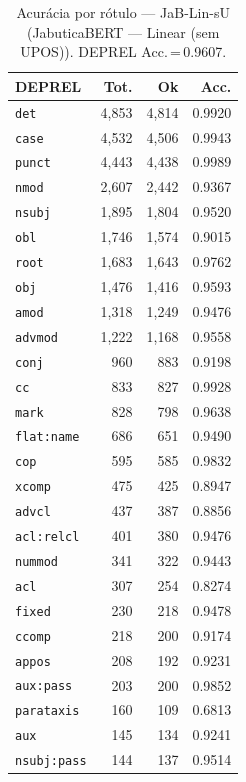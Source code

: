 \begin{table}[ht]
\centering
\caption{Acurácia por rótulo --- JaB-Lin-sU (JabuticaBERT — Linear (sem UPOS)). DEPREL Acc.\,=\,0.9607.}
\label{tab:acc-predict-test-ablacao-linear-amadeusai-modernJabuticaBERT-Base-1k}
\scriptsize
\begin{tabular}{lrrr}
\toprule
\textbf{DEPREL} & \textbf{Tot.} & \textbf{Ok} & \textbf{Acc.} \\
\midrule
\texttt{det} & 4,853 & 4,814 & 0.9920 \\
\texttt{case} & 4,532 & 4,506 & 0.9943 \\
\texttt{punct} & 4,443 & 4,438 & 0.9989 \\
\texttt{nmod} & 2,607 & 2,442 & 0.9367 \\
\texttt{nsubj} & 1,895 & 1,804 & 0.9520 \\
\texttt{obl} & 1,746 & 1,574 & 0.9015 \\
\texttt{root} & 1,683 & 1,643 & 0.9762 \\
\texttt{obj} & 1,476 & 1,416 & 0.9593 \\
\texttt{amod} & 1,318 & 1,249 & 0.9476 \\
\texttt{advmod} & 1,222 & 1,168 & 0.9558 \\
\texttt{conj} & 960 & 883 & 0.9198 \\
\texttt{cc} & 833 & 827 & 0.9928 \\
\texttt{mark} & 828 & 798 & 0.9638 \\
\texttt{flat\!:\!name} & 686 & 651 & 0.9490 \\
\texttt{cop} & 595 & 585 & 0.9832 \\
\texttt{xcomp} & 475 & 425 & 0.8947 \\
\texttt{advcl} & 437 & 387 & 0.8856 \\
\texttt{acl\!:\!relcl} & 401 & 380 & 0.9476 \\
\texttt{nummod} & 341 & 322 & 0.9443 \\
\texttt{acl} & 307 & 254 & 0.8274 \\
\texttt{fixed} & 230 & 218 & 0.9478 \\
\texttt{ccomp} & 218 & 200 & 0.9174 \\
\texttt{appos} & 208 & 192 & 0.9231 \\
\texttt{aux\!:\!pass} & 203 & 200 & 0.9852 \\
\texttt{parataxis} & 160 & 109 & 0.6813 \\
\texttt{aux} & 145 & 134 & 0.9241 \\
\texttt{nsubj\!:\!pass} & 144 & 137 & 0.9514 \\

\end{tabular}
\end{table}
